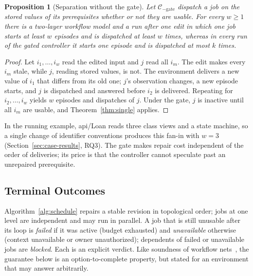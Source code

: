 \documentclass[pdflatex,sn-mathphys-num]{sn-jnl}
\theoremstyle{thmstyleone}%
\newtheorem{proposition}[theorem]{Proposition}%
\theoremstyle{thmstyletwo}%
\theoremstyle{thmstylethree}%
\newcommand{\vw}[1]{\textsf{#1}}
\begin{document}
\begin{proposition}[Separation without the gate]\label{prop:eager}
Let $\mathcal C_{-\mathrm{gate}}$ dispatch a job on the stored values of its prerequisites whether or not they are usable. For every $w\ge1$ there is a two-layer workflow model and a run after one edit in which one job starts at least $w$ episodes and is dispatched at least $w$ times, whereas in every run of the gated controller it starts one episode and is dispatched at most $k$ times.
\end{proposition}
\begin{proof}
Let $i_1,\ldots,i_w$ read the edited input and $j$ read all $i_m$. The edit makes every $i_m$ stale, while $j$, reading stored values, is not. The environment delivers a new value of $i_1$ that differs from its old one; $j$'s observation changes, a new episode starts, and $j$ is dispatched and answered before $i_2$ is delivered. Repeating for $i_2,\ldots,i_w$ yields $w$ episodes and dispatches of $j$. Under the gate, $j$ is inactive until all $i_m$ are usable, and Theorem~\ref{thm:single} applies.
\end{proof}
In the running example, \vw{api/Loan} reads three class views and a state machine, so a single change of identifier conventions produces this fan-in with $w=3$ (Section~\ref{sec:case-results}, RQ3). The gate makes repair cost independent of the order of deliveries; its price is that the controller cannot speculate past an unrepaired prerequisite.

\subsection{Terminal Outcomes}
Algorithm~\ref{alg:schedule} repairs a stable revision in topological order; jobs at one level are independent and may run in parallel. A job that is still unusable after its loop is \emph{failed} if it was active (budget exhausted) and \emph{unavailable} otherwise (context unavailable or owner unauthorized); dependents of failed or unavailable jobs are \emph{blocked}. Each is an explicit verdict. Like soundness of workflow nets~\cite{vanderaalst1998workflow}, the guarantee below is an option-to-complete property, but stated for an environment that may answer arbitrarily.
\end{document}
